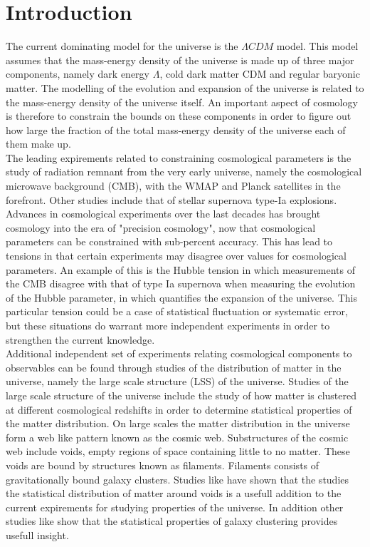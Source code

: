 \chapter{Introduction}
The current dominating model for the universe is the $\Lambda CDM$ model. This model assumes that the mass-energy density of the universe is made up of three major components, namely dark energy $\Lambda$, cold dark matter CDM and regular baryonic matter. The modelling of the evolution and expansion of the universe is related to the mass-energy density of the universe itself. An important aspect of cosmology is therefore to constrain the bounds on these components in order to figure out how large the fraction of the total mass-energy density of the universe each of them make up.\\\indent
The leading expirements related to constraining cosmological parameters is the study of radiation remnant from the very early universe, namely the cosmological microwave background (CMB)\cite{1965cmb}, with the WMAP\cite{Wmap} and Planck satellites\cite{planckvi} in the forefront. Other studies include that of stellar supernova type-Ia explosions\cite{Pantheon}. Advances in cosmological experiments over the last decades has brought cosmology into the era of "precision cosmology", now that cosmological parameters can be constrained with sub-percent accuracy. This has lead to tensions in that certain experiments may disagree over values for cosmological parameters. An example of this is the Hubble tension in which measurements of the CMB disagree with that of type Ia supernova when measuring the evolution of the Hubble parameter, in which quantifies the expansion of the universe. This particular tension could be a case of statistical fluctuation or systematic error, but these situations do warrant more independent experiments in order to strengthen the current knowledge.\\\indent Additional independent set of experiments relating cosmological components to observables can be found through studies of the distribution of matter in the universe, namely the large scale structure (LSS) of the universe. Studies of the large scale structure of the universe include the study of how matter is clustered at different cosmological redshifts in order to determine statistical properties of the matter distribution. On large scales the matter distribution in the universe form a web like pattern known as the cosmic web\cite{bondweb}. Substructures of the cosmic web include voids, empty regions of space containing little to no matter. These voids are bound by structures known as filaments. Filaments consists of gravitationally bound galaxy clusters. Studies like \cite{BeyondBAO}\cite{Nadathur_2020} have shown that the studies the statistical distribution of matter around voids is a usefull addition to the current expirements for studying properties of the universe. In addition other studies like \cite{refId0} show that the statistical properties of galaxy clustering provides usefull insight. \\\indent
